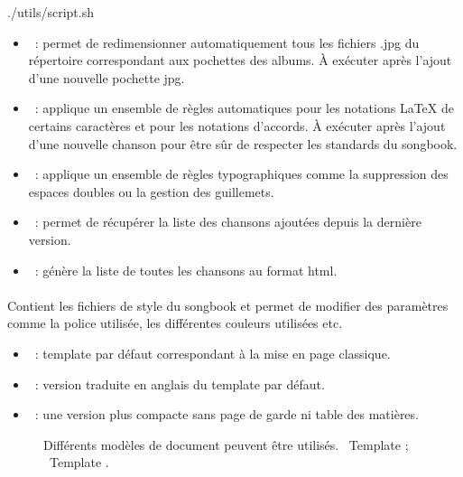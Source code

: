 \begin{unix}
  ./utils/script.sh
\end{unix}

\begin{itemize}
\item {}~: permet de redimensionner
  automatiquement tous les fichiers .jpg du répertoire
   correspondant aux pochettes des albums. À
  exécuter après l'ajout d'une nouvelle pochette jpg.

\item {}~: applique un ensemble de règles
  automatiques pour les notations \LaTeX{} de certains caractères et
  pour les notations d'accords.  À exécuter après l'ajout d'une
  nouvelle chanson pour être sûr de respecter les standards du
  songbook.

\item {}~: applique un ensemble de règles typographiques
  comme la suppression des espaces doubles ou la gestion des
  guillemets.

\item {}~: permet de récupérer la liste des
  chansons ajoutées depuis la dernière version.

\item {}~: génère la liste de toutes les chansons au
  format html.
\end{itemize}

\paragraph{}
Contient les fichiers de style du songbook et permet de modifier des
paramètres comme la police utilisée, les différentes couleurs
utilisées etc.

\begin{itemize}
\item {}~: template par défaut correspondant à la
  mise en page classique.
\item {}~: version traduite en anglais du
  template par défaut.
\item {}~: une version plus compacte sans page de
  garde ni table des matières.
\end{itemize}

\begin{figure}
  \centering
  \hspace{0.1cm}%
  \caption[Templates]{%
    Différents modèles de document peuvent être utilisés.
    ~Template ; %
    ~Template .%
  }%
  \label{fig:templates}
\end{figure}


